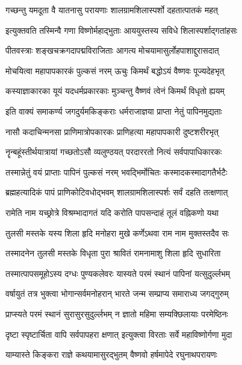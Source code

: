 \twolineshloka
{गच्छन्तु यमदूता वै यातनासु परायणाः}
{शालग्रामशिलास्पर्शो दहतात्पातकं महत्}%

\twolineshloka
{इत्युक्तवति तस्मिन्वै गणा विष्णोर्महाद्भुताः}
{आययुस्तस्य सविधे शिलास्पर्शाद्गतांहसः}%

\twolineshloka
{पीतवस्त्राः शङ्खचक्रगदापद्मविराजिताः}
{आगत्य मोचयामासुर्लोहपाशाद्दुरासदात्}%

\twolineshloka
{मोचयित्वा महापापकारकं पुल्कसं नरम्}
{ऊचुः किमर्थं बद्धोऽयं वैष्णवः पूज्यदेहभृत्}%

\twolineshloka
{कस्याज्ञाकारका यूयं यदधर्मप्रकारकाः}
{मुञ्चन्तु वैष्णवं त्वेनं किमर्थं विधृतो ह्ययम्}%

\twolineshloka
{इति वाक्यं समाकर्ण्य जगदुर्यमकिङ्कराः}
{धर्मराजाज्ञया प्राप्ता नेतुं पापिनमुद्यताः}%

\twolineshloka
{नासौ कदाचिन्मनसा प्राणिमात्रोपकारकः}
{प्राणिहत्या महापापकारी दुष्टशरीरभृत्}%

\twolineshloka
{नॄन्बहूंस्तीर्थयात्रायां गच्छतोऽसौ व्यलुण्ठयत्}
{परदाररतो नित्यं सर्वपापाधिकारकः}%

\twolineshloka
{तस्मान्नेतुं वयं प्राप्ताः पापिनं पुल्कसं नरम्}
{भवद्भिर्मोचितः कस्मादकस्मादागतैर्भटैः}%


\twolineshloka
{ब्रह्महत्यादिकं पापं प्राणिकोटिवधोद्भवम्}
{शालग्रामशिलास्पर्शः सर्वं दहति तत्क्षणात्}%

\twolineshloka
{रामेति नाम यच्छ्रोत्रे विश्रम्भादागतं यदि}
{करोति पापसन्दाहं तूलं वह्निकणो यथा}%

\twolineshloka
{तुलसी मस्तके यस्य शिला हृदि मनोहरा}
{मुखे कर्णेऽथवा राम नाम मुक्तस्तदैव सः}%

\twolineshloka
{तस्मादनेन तुलसी मस्तके विधृता पुरा}
{श्रावितं रामनामाशु शिला हृदि सुधारिता}%

\twolineshloka
{तस्मात्पापसमूहोऽस्य दग्धः पुण्यकलेवरः}
{यास्यते परमं स्थानं पापिनां यत्सुदुर्ल्लभम्}%

\twolineshloka
{वर्षायुतं तत्र भुक्त्वा भोगान्सर्वमनोहरान्}
{भारते जन्म सम्प्राप्य समाराध्य जगद्गुरुम्}%

\twolineshloka
{प्राप्स्यते परमं स्थानं सुरासुरसुदुर्ल्लभम्}
{न ज्ञातो महिमा सम्यक्छिलायाः परमेष्ठिनः}%

\twolineshloka
{दृष्टा स्पृष्टार्चिता वापि सर्वपापहरा क्षणात्}
{इत्युक्त्वा विरताः सर्वे महाविष्णोर्गणा मुदा}%

\twolineshloka
{याम्यास्ते किङ्करा राज्ञे कथयामासुरद्भुतम्}
{वैष्णवो हर्षमापेदे रघुनाथपरायणः}%


